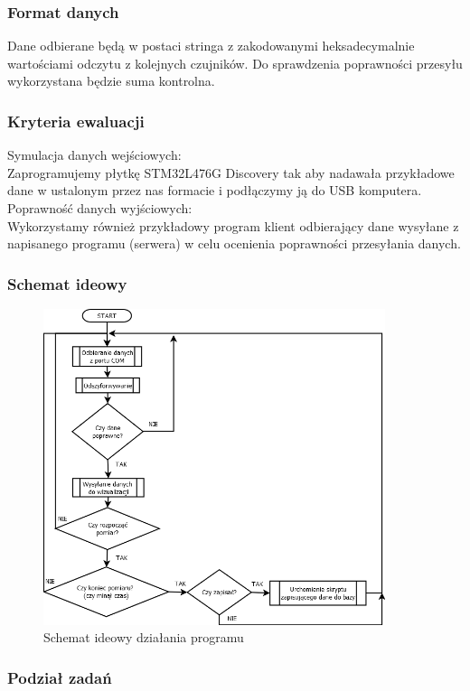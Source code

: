 \documentclass{article}
\begin{document}
\subsubsection{Format danych}
Dane odbierane będą w postaci stringa z zakodowanymi heksadecymalnie wartościami odczytu z kolejnych czujników. Do sprawdzenia poprawności przesyłu wykorzystana będzie suma kontrolna.
\subsubsection{Kryteria ewaluacji}
Symulacja danych wejściowych: \\
Zaprogramujemy płytkę STM32L476G Discovery tak aby nadawała przykładowe dane w ustalonym przez nas formacie i podłączymy ją do USB komputera.  \\
Poprawność danych wyjściowych:\\
Wykorzystamy również przykładowy program klient odbierający dane wysyłane z napisanego programu (serwera) w celu ocenienia poprawności przesyłania danych.\\

\subsubsection{Schemat ideowy}
\begin{figure}[h!]
\label{fig:program}
\centering
\includegraphics[width=10cm]{programdia.png}
\caption{Schemat ideowy działania programu}
\end{figure}
\subsubsection{Podział zadań}
\end{document}
